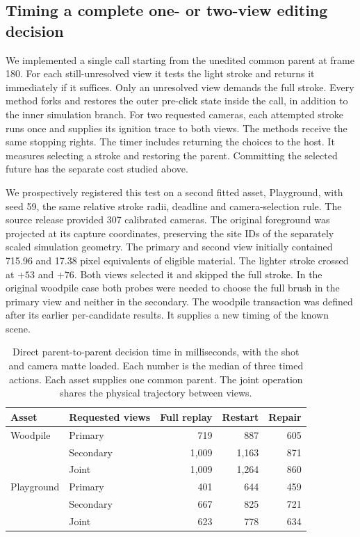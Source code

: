 \subsection{Timing a complete one- or two-view editing decision}
We implemented a single call starting from the unedited common parent at frame 180. For each still-unresolved view it tests the light stroke and returns it immediately if it suffices. Only an unresolved view demands the full stroke. Every method forks and restores the outer pre-click state inside the call, in addition to the inner simulation branch. For two requested cameras, each attempted stroke runs once and supplies its ignition trace to both views. The methods receive the same stopping rights. The timer includes returning the choices to the host. It measures selecting a stroke and restoring the parent. Committing the selected future has the separate cost studied above.

We prospectively registered this test on a second fitted asset, Playground, with seed 59, the same relative stroke radii, deadline and camera-selection rule. The source release provided 307 calibrated cameras. The original foreground was projected at its capture coordinates, preserving the site IDs of the separately scaled simulation geometry. The primary and second view initially contained 715.96 and 17.38 pixel equivalents of eligible material. The lighter stroke crossed at $+53$ and $+76$. Both views selected it and skipped the full stroke. In the original woodpile case both probes were needed to choose the full brush in the primary view and neither in the secondary. The woodpile transaction was defined after its earlier per-candidate results. It supplies a new timing of the known scene.

\begin{table}[t]
\caption{Direct parent-to-parent decision time in milliseconds, with the shot and camera matte loaded. Each number is the median of three timed actions. Each asset supplies one common parent. The joint operation shares the physical trajectory between views.}
\label{tab:choice}
\centering\small
\begin{tabular}{llrrr}\toprule
Asset & Requested views & Full replay & Restart & Repair\\\midrule
Woodpile & Primary & 719 & 887 & 605\\
 & Secondary & 1,009 & 1,163 & 871\\
 & Joint & 1,009 & 1,264 & 860\\\midrule
Playground & Primary & 401 & 644 & 459\\
 & Secondary & 667 & 825 & 721\\
 & Joint & 623 & 778 & 634\\\bottomrule
\end{tabular}
\end{table}

